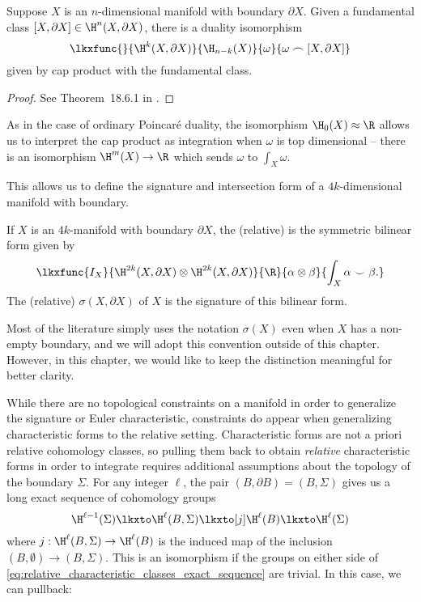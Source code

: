\begin{theorem}
	Suppose $X$ is an $n$-dimensional manifold with boundary $\partial X$. Given a fundamental class $[X, \partial X]\in \H^{n}(X, \partial X)$, there is a duality isomorphism
	\[
		\lkxfunc{}{\H^k(X, \partial X)}{\H_{n-k}(X)}{\omega}{\omega\frown [X,\partial X]}
	\]
	given by cap product with the fundamental class.
\end{theorem}
\begin{proof}
	See Theorem~18.6.1 in \cite{dieck2008algebraic}.
\end{proof}
As in the case of ordinary Poincar\'e duality, the isomorphism $\H_0(X)\approx \R$ allows us to interpret the cap product as integration when $\omega$ is top dimensional -- there is an isomorphism $\H^m(X)\to \R$ which sends $\omega$ to $\int_X \omega$.

This allows us to define the signature and intersection form of a $4k$-dimensional manifold with boundary.

\begin{definition}
	If $X$ is an $4k$-manifold with boundary $\partial X$, the (relative)  is the symmetric bilinear form given by
	\[
		\lkxfunc{I_{X}}{\H^{2k}(X, \partial X)\otimes \H^{2k}(X, \partial X)}
		{\R}{\alpha\otimes \beta}{\int_X \alpha\smile \beta.}
	\]
	The (relative)  $\sigma(X, \partial X)$ of $X$ is the signature of this bilinear form.
\end{definition}

\begin{convention*}
	Most of the literature simply uses the notation $\sigma(X)$ even when $X$ has a non-empty boundary, and we will adopt this convention outside of this chapter. However, in this chapter, we would like to keep the distinction meaningful for better clarity.
\end{convention*}

While there are no topological constraints on a manifold in order to generalize the signature or Euler characteristic, constraints do appear when generalizing characteristic forms to the relative setting.
Characteristic forms are not a priori relative cohomology classes, so pulling them back to obtain \emph{relative} characteristic forms in order to integrate requires additional assumptions about the topology of the boundary $\Sigma$.
For any integer $\ell$, the pair $(B, \partial B) = (B, \Sigma)$ gives us a long exact sequence of cohomology groups
\begin{equation}\label{eq:relative_characteristic_classes_exact_sequence}
	\H^{\ell-1}(\Sigma) \lkxto \H^{\ell}(B, \Sigma) \lkxto[j] \H^{\ell}(B) \lkxto \H^{\ell}(\Sigma)
\end{equation}
where $j : \H^{\ell}(B, \Sigma) \to \H^{\ell}(B)$ is the induced map of the inclusion $(B,\emptyset) \to (B, \Sigma)$. This is an isomorphism if the groups on either side of \cref{eq:relative_characteristic_classes_exact_sequence} are trivial. In this case, we can pullback:

